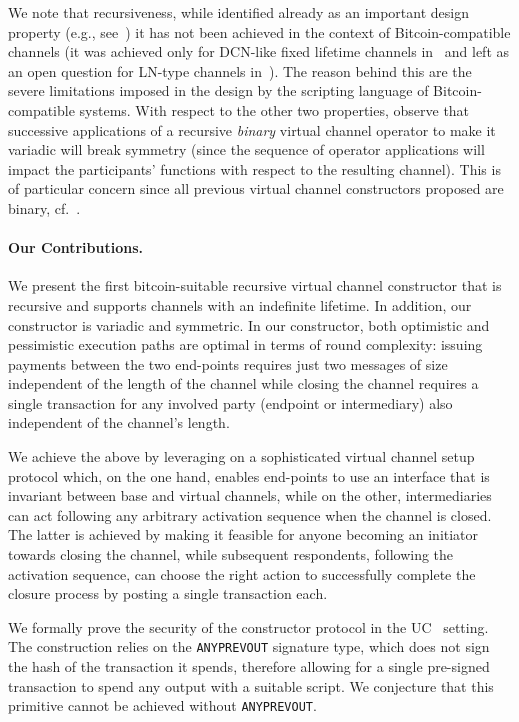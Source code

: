 We note that recursiveness, while identified already as an important design property (e.g., see~\cite{DBLP:conf/ccs/DziembowskiFH18}) it has not been achieved in the context of Bitcoin-compatible channels 
(it was achieved only for DCN-like fixed lifetime channels in~\cite{10.1007/978-3-030-65411-5_18} and left as an open question for LN-type channels in~\cite{cryptoeprint:2020:554}). 
The reason behind this are the severe limitations imposed in the design by the scripting language of Bitcoin-compatible systems. 
%
With respect to the other two properties, observe that successive applications of a recursive {\em binary} virtual channel operator to make it variadic will break symmetry (since the sequence of operator applications will impact the participants' functions with respect to the resulting channel). This is of particular concern since all previous virtual channel constructors proposed are binary, cf.~\cite{DBLP:conf/ccs/DziembowskiFH18,cryptoeprint:2020:554,10.1007/978-3-030-65411-5_18}. 

\paragraph{Our Contributions.}  We present  the first  bitcoin-suitable recursive virtual channel constructor that is recursive and supports channels with an indefinite lifetime. In addition, our constructor is variadic and symmetric. In our constructor, both optimistic and pessimistic execution paths are optimal in terms of round complexity: issuing payments between the two end-points requires just two messages of size independent of the length of the channel while
closing the channel requires a single transaction for any involved party (endpoint or intermediary) also independent of the channel's length. 

We achieve the above by leveraging on a sophisticated virtual channel setup protocol which, on the one hand, enables end-points to use an interface that is invariant between base and virtual channels, 
while on the other, intermediaries can act following any arbitrary activation sequence when the channel is closed. The latter is achieved by making it feasible for anyone becoming an initiator towards closing the channel, while subsequent respondents, following the activation sequence, can choose the right action to successfully complete the closure process by posting a single transaction each. 

  We formally prove the security of the constructor protocol in the  UC~\cite{uc} setting. The construction relies on the \texttt{ANYPREVOUT}   signature type, which does not sign the hash of the transaction it spends, therefore allowing for a single pre-signed transaction to spend any output
  with a suitable script. We conjecture that this primitive cannot be achieved without \texttt{ANYPREVOUT}. 
 
